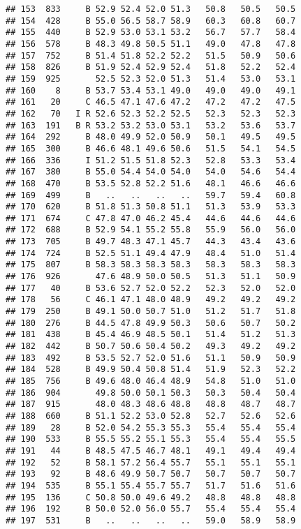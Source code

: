 \documentclass[]{article}
\begin{document}
\begin{verbatim}
## 153  833     B 52.9 52.4 52.0 51.3   50.8   50.5   50.5
## 154  428     B 55.0 56.5 58.7 58.9   60.3   60.8   60.7
## 155  440     B 52.9 53.0 53.1 53.2   56.7   57.7   58.4
## 156  578     B 48.3 49.8 50.5 51.1   49.0   47.8   47.8
## 157  752     B 51.4 51.8 52.2 52.2   51.5   50.9   50.6
## 158  826     B 51.9 52.4 52.9 52.4   51.8   52.2   52.4
## 159  925       52.5 52.3 52.0 51.3   51.4   53.0   53.1
## 160    8     B 53.7 53.4 53.1 49.0   49.0   49.0   49.1
## 161   20     C 46.5 47.1 47.6 47.2   47.2   47.2   47.5
## 162   70   I R 52.6 52.3 52.2 52.5   52.3   52.3   52.3
## 163  191   B R 53.2 53.2 53.0 53.1   53.2   53.6   53.7
## 164  292     B 48.0 49.9 52.0 50.9   50.1   49.5   49.5
## 165  300     B 46.6 48.1 49.6 50.6   51.5   54.1   54.5
## 166  336     I 51.2 51.5 51.8 52.3   52.8   53.3   53.4
## 167  380     B 55.0 54.4 54.0 54.0   54.0   54.6   54.4
## 168  470     B 53.5 52.8 52.2 51.6   48.1   46.6   46.6
## 169  499     B   ..   ..   ..   ..   59.7   59.4   60.8
## 170  620     B 51.8 51.3 50.8 51.1   51.3   53.9   53.3
## 171  674     C 47.8 47.0 46.2 45.4   44.6   44.6   44.6
## 172  688     B 52.9 54.1 55.2 55.8   55.9   56.0   56.0
## 173  705     B 49.7 48.3 47.1 45.7   44.3   43.4   43.6
## 174  724     B 52.5 51.1 49.4 47.9   48.4   51.0   51.4
## 175  807     B 58.3 58.3 58.3 58.3   58.3   58.3   58.3
## 176  926       47.6 48.9 50.0 50.5   51.3   51.1   50.9
## 177   40     B 53.6 52.7 52.0 52.2   52.3   52.0   52.0
## 178   56     C 46.1 47.1 48.0 48.9   49.2   49.2   49.2
## 179  250     B 49.1 50.0 50.7 51.0   51.2   51.7   51.8
## 180  276     B 44.5 47.8 49.9 50.3   50.6   50.7   50.2
## 181  438     B 45.4 46.9 48.5 50.1   51.4   51.2   51.3
## 182  442     B 50.7 50.6 50.4 50.2   49.3   49.2   49.2
## 183  492     B 53.5 52.7 52.0 51.6   51.1   50.9   50.9
## 184  528     B 49.9 50.4 50.8 51.4   51.9   52.3   52.2
## 185  756     B 49.6 48.0 46.4 48.9   54.8   51.0   51.0
## 186  904       49.8 50.0 50.1 50.3   50.3   50.4   50.4
## 187  915       48.0 48.3 48.6 48.8   48.8   48.7   48.7
## 188  660     B 51.1 52.2 53.0 52.8   52.7   52.6   52.6
## 189   28     B 52.0 54.2 55.3 55.3   55.4   55.4   55.4
## 190  533     B 55.5 55.2 55.1 55.3   55.4   55.4   55.5
## 191   44     B 48.5 47.5 46.7 48.1   49.1   49.4   49.4
## 192   52     B 58.1 57.2 56.4 55.7   55.1   55.1   55.1
## 193   92     B 48.6 49.9 50.7 50.7   50.7   50.7   50.7
## 194  535     B 55.1 55.4 55.7 55.7   51.7   51.6   51.6
## 195  136     C 50.8 50.0 49.6 49.2   48.8   48.8   48.8
## 196  192     B 50.0 52.0 56.0 55.7   55.4   55.4   55.4
## 197  531     B   ..   ..   ..   ..   59.0   58.9   58.9

\end{verbatim}
\end{document}
